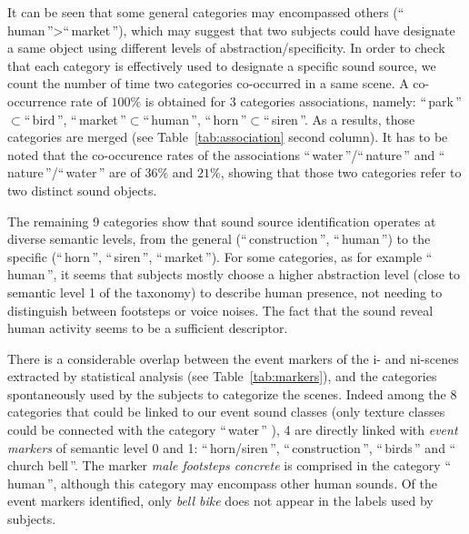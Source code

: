 \documentclass[twoside,twocolumn]{article}
\begin{document}
It can be seen that some general categories may encompassed others (``\,human\,''>``\,market\,''), which may suggest that two subjects could have designate a same object using different levels of abstraction/specificity. In order to check that each category is effectively used to designate a specific sound source, we count the number of time two categories co-occurred in a same scene. A co-occurrence rate of $100\%$ is obtained for 3 categories associations, namely:  ``\,park\,''$\subset$``\,bird\,'', ``\,market\,''$\subset$``\,human\,'', ``\,horn\,''$\subset$``\,siren\,''. As a results, those categories are merged (see Table~\ref{tab:association} second column). It has to be noted that the co-occurence rates of the associations ``\,water\,''/``\,nature\,'' and ``\,nature\,''/``\,water\,'' are of $36\%$ and $21\%$, showing that those two categories refer to two distinct sound objects.

The remaining 9 categories show that sound source identification operates at diverse semantic levels, from the general (``\,construction\,'', ``\,human\,'') to the specific (``\,horn\,'', ``\,siren\,'', ``\,market\,''). For some categories, as for example  ``\,human\,'',  it seems that subjects mostly choose a higher abstraction level (close to semantic level 1 of the taxonomy) to describe human presence, not needing to distinguish between footsteps or voice noises. The fact that the sound reveal human activity seems to be a sufficient descriptor.

There is a considerable overlap between the event markers of the i- and ni-scenes extracted by statistical analysis (see Table~\ref{tab:markers}), and the categories spontaneously used by the subjects to categorize the scenes. Indeed among the 8 categories that could be linked to our event sound classes (only texture classes could be connected with the category ``\,water\,'' ), 4 are directly linked with \emph{event markers} of semantic level 0 and 1: ``\,horn/siren\,'', ``\,construction\,'', ``\,birds\,'' and ``\,church bell\,''. The marker \textit{male footsteps concrete} is comprised in the category ``\,human\,'', although this category may encompass other human sounds.  Of the event markers identified, only  \textit{bell bike} does not appear in the labels used by subjects.  

 
\end{document}

